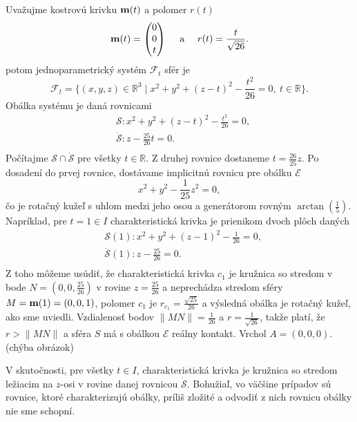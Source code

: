 \begin{example}
Uvažujme kostrovú krivku $\bold{m}(t)$ a polomer $r(t)$
$$
\bold{m}(t) = \begin{pmatrix} 0 \\ 0 \\ t \end{pmatrix} \quad \text{ a } \quad r(t) = \frac{t}{\sqrt{26}}.
$$
potom jednoparametrický systém $\mathcal{F}_t$ sfér je
$$
\mathcal{F}_t = \{(x, y, z) \in \mathbb{R}^3 \mid x^2 + y^2 + (z - t)^2 - \frac{t^2}{26} = 0, \ t \in \mathbb{R}\}.
$$
Obálka systému je daná rovnicami
\begin{align*}
&\mathcal{S} \colon x^2 + y^2 + (z - t)^2 - \frac{t^2}{26} = 0, \\
&\mathcal{\dot{S}} \colon z - \frac{25}{26}t = 0. \\
\end{align*}
Počítajme $ \mathcal{S} \cap \mathcal{\dot{S}} $ pre všetky $t \in \mathbb{R}.$ Z druhej rovnice dostaneme $t = \frac{26}{25}z$. Po dosadení do prvej rovnice, dostávame implicitnú rovnicu pre obálku $\mathcal{E}$
$$
x^2 + y^2 - \frac{1}{25}z^2 = 0,
$$
čo je rotačný kužeľ s uhlom medzi jeho osou a generátorom rovným $\arctan\left(\frac{1}{5}\right)$.
Napríklad, pre $t = 1 \in I$ charakteristická krivka je prienikom dvoch plôch daných
\begin{align*}
&\mathcal{S}(1) \colon x^2 + y^2 + (z - 1)^2 - \frac{1}{26} = 0, \\
&\mathcal{\dot{S}}(1) \colon z - \frac{25}{26} = 0. \\
\end{align*}
Z toho môžeme usúdiť, že charakteristická krivka $c_1$ je kružnica so stredom v bode $N = (0, 0, \frac{25}{26})$ v rovine $z = \frac{25}{26}$ a neprechádza stredom sféry $M = \bold{m}(1) = (0,0,1)$, polomer $c_1$ je $r_{c_{1}} = \frac{\sqrt{25}}{26}$ a výsledná obálka je rotačný kužeľ, ako sme uviedli. Vzdialenosť bodov $ \|MN\| = \frac{1}{26}$ a $r = \frac{1}{\sqrt{26}}$, takže platí, že $r > \|MN\|$ a sféra $S$ má s obálkou $\mathcal{E}$ reálny kontakt. Vrchol $A = (0,0,0)$. (chýba obrázok)
\end{example}
V skutočnosti, pre všetky $t \in I$, charakteristická krivka je kružnica so stredom ležiacim na $z$-osi v rovine danej rovnicou $\mathcal{\dot{S}} $.
Bohužiaľ, vo väčšine prípadov sú rovnice, ktoré charakterizujú obálky, príliš zložité a odvodiť z nich rovnicu obálky nie sme schopní.

